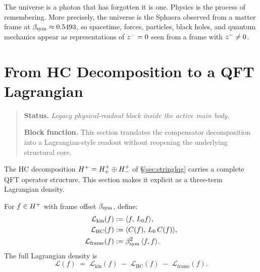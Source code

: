 

\begin{remark}
The universe is a photon that has forgotten it is one. Physics is the
process of remembering. More precisely, the universe is the Sphaera
observed from a matter frame at $\beta_{\mathrm{sym}}\approx 0.5493$, so spacetime,
forces, particles, black holes, and quantum mechanics appear as
representations of $z^-=0$ seen from a frame with $z^-\neq 0$.
\end{remark}



\section{From HC Decomposition to a QFT Lagrangian}
\begin{quote}\small
\noindent\textbf{Status.} \emph{Legacy physical-readout block inside the active main body.}\par
\noindent\textbf{Block function.} This section translates the compensator decomposition into a Lagrangian-style readout without reopening the underlying structural core.
\end{quote}
\label{sec:lagrangian}

\begin{remark}
The HC decomposition $H^+=H^+_+\oplus H^+_-$ of \S\ref{sec:stringlqg}
carries a complete QFT operator structure.
This section makes it explicit as a three-term Lagrangian density.
\end{remark}

\begin{definition}\label{def:lagrangian}
For $f\in H^+$ with frame offset $\beta_{\mathrm{sym}}$, define:
\begin{align}
 \mathcal{L}_{\mathrm{kin}}(f)
 &:= \langle f,\,L_0 f\rangle,\label{eq:L_kin}\\
 \mathcal{L}_{\mathrm{HC}}(f)
 &:= \langle C(f),\,L_0\,C(f)\rangle,\label{eq:L_HC}\\
 \mathcal{L}_{\mathrm{frame}}(f)
 &:= \beta_{\mathrm{sym}}^2\,\langle f,f\rangle.\label{eq:L_frame}
\end{align}
The full Lagrangian density is
\[
 \mathcal{L}(f)
 \;=\;
 \mathcal{L}_{\mathrm{kin}}(f)
 \;-\;
 \mathcal{L}_{\mathrm{HC}}(f)
 \;-\;
 \mathcal{L}_{\mathrm{frame}}(f).
\]
\end{definition}

